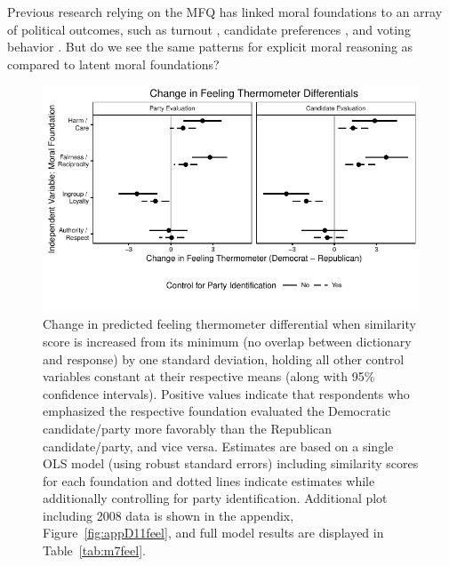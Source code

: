 \documentclass[12pt]{article}
\begin{document}
Previous research relying on the MFQ has linked moral foundations to an array of political outcomes, such as turnout \citep{johnson2014ideology}, candidate preferences \citep{iyer2010beyond}, and voting behavior \citep{franks2015using}. But do we see the same patterns for explicit moral reasoning as compared to latent moral foundations?

\begin{figure}[h]\centering
\includegraphics{../calc/fig/ols_feel.pdf}
\caption{Change in predicted feeling thermometer differential when similarity score is increased from its minimum (no overlap between dictionary and response) by one standard deviation, holding all other control variables constant at their respective means (along with 95\% confidence intervals). Positive values indicate that respondents who emphasized the respective foundation evaluated the Democratic candidate/party more favorably than the Republican candidate/party, and vice versa. Estimates are based on a single OLS model (using robust standard errors) including similarity scores for each foundation and dotted lines indicate estimates while additionally controlling for party identification. Additional plot including 2008 data is shown in the appendix, Figure~\ref{fig:appD11feel}, and full model results are displayed in Table~\ref{tab:m7feel}.}\label{fig:ols_feel}
\end{figure}
\end{document}

